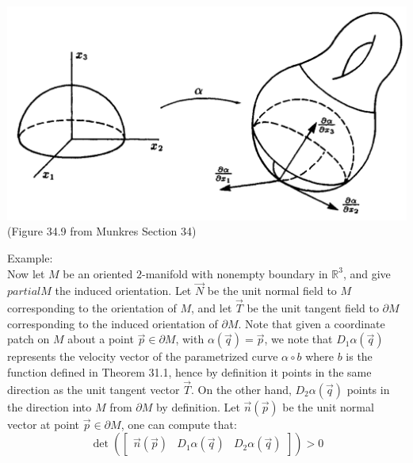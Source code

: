 \documentclass[15pt]{book}
\theoremstyle{break}
\theoremstyle{break}
\newcommand{\R}{\mathbb{R}}
\newcommand{\bmat}[1]{\begin{bmatrix} #1 \end{bmatrix}}
\newcommand{\example}{\color{green}Example: \color{black}}
\begin{document}
\begin{center}
\includegraphics[scale=0.29]{3Orientation.png}\\
(Figure 34.9 from Munkres Section 34)
\end{center}

\example \\
Now let $M$ be an oriented $2$-manifold with nonempty boundary in $\R^3$, and give $partial M$ the induced orientation. Let $\vec{N}$ be the unit normal field to $M$ corresponding to the orientation of $M$, and let $\vec{T}$ be the unit tangent field to $\partial M$ corresponding to the induced orientation of $\partial M$. Note that given a coordinate patch on $M$ about a point $\vec{p} \in \partial M$, with $\alpha(\vec{q}) = \vec{p}$, we note that $D_1\alpha(\vec{q})$ represents the velocity vector of the parametrized curve $\alpha\circ b$ where $b$ is the function defined in Theorem 31.1, hence by definition it points in the same direction as the unit tangent vector $\vec{T}$. On the other hand, $D_2\alpha(\vec{q})$ points in the direction into $M$ from $\partial M$ by definition. Let $\vec{n}(\vec{p})$ be the unit normal vector at point $\vec{p} \in \partial M$, one can compute that: 
$$\det\left(\bmat{\vec{n}(\vec{p})& D_1\alpha(\vec{q})& D_2\alpha(\vec{q})}\right) > 0$$ 
\end{document}
